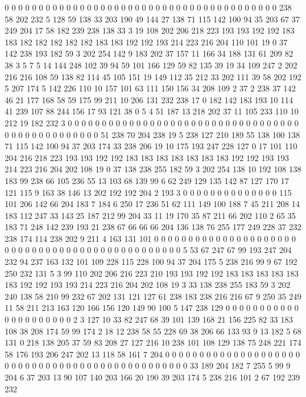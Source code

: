 0 0 0 0 0 0 0 0 0 0 0 0 0 0 0 0 0 0 0 0
0 0 0 0 0 0 0 0 0 0 0 0 0 0 0 0 0 0 0 0
238 58 202 232 5 128 59 138 33 203 190 49 144 27 138 71 115 142 100 94
35 203 67 37 249 204 17 58 182 239 238 138 33 3 19 108 202 206 218 223
193 193 192 192 183 183 182 182 182 182 182 183 183 192 192 193 214 223 216 204
110 101 19 0 37 142 238 193 182 59 3 202 254 142 9 183 202 37 157 11
166 34 188 131 61 209 82 38 3 5 7 5 14 144 248 102 39 94 59 101
166 129 59 82 135 39 19 34 109 247 2 202 216 216 108 59 138 82 114 45
105 151 19 149 112 35 212 33 202 111 39 58 202 192 5 207 174 5 142 226
110 10 157 101 63 111 150 156 34 208 109 2 37 2 238 37 142 46 21 177
168 58 59 175 99 211 10 206 131 232 238 17 0 182 142 183 193 10 114 41
239 107 88 244 156 17 93 121 38 0 5 4 51 187 13 218 202 37 11 105
233 110 10 212 19 182 232 3 0 0 0 0 0 0 0 0 0 0 0 0
0 0 0 0 0 0 0 0 0 0 0 0 0 0 0 0 0 0 0 0
0 0 0 0 0 0 0 0 0 0 0 0 0 0 0 0 51 238 70 204
238 19 5 238 127 210 189 55 138 100 138 71 115 142 100 94 37 203 174 33
238 206 19 10 175 193 247 228 127 0 17 101 110 204 216 218 223 193 193 192
192 183 183 183 183 183 183 183 192 192 193 193 214 223 216 204 202 108 19 0
37 138 238 255 182 59 3 202 254 138 10 192 108 138 183 99 238 66 105 236
55 13 103 68 139 99 6 62 249 129 135 142 87 127 170 17 121 115 9 163
38 146 13 202 192 192 204 2 193 3 0 0 0 0 0 0 0 0 0 0
0 0 0 0 115 101 206 142 66 204 183 7 184 6 250 17 236 51 62 111
149 100 188 7 45 211 208 14 183 112 247 33 143 25 187 212 99 204 33 11
19 170 35 87 211 66 202 110 2 65 35 183 71 248 142 239 193 21 238 67
66 66 66 204 136 138 76 255 177 249 228 37 232 238 174 114 238 202 9 211
4 163 131 101 0 0 0 0 0 0 0 0 0 0 0 0 0 0 0 0
0 0 0 0 0 0 0 0 0 0 0 0 0 0 0 0 0 0 0 0
0 0 0 0 0 0 0 0 0 0 0 5 53 67 247 67 99 193 247 204
232 94 237 163 132 101 109 228 115 228 100 94 37 204 175 5 238 216 99 9
67 192 250 232 131 5 3 99 110 202 206 216 223 210 193 193 192 192 183 183
183 183 183 183 192 192 193 193 214 223 216 204 202 108 19 3 33 138 238 255
183 59 3 202 240 138 58 210 99 232 67 202 131 121 127 61 238 183 238 216
216 67 9 250 35 249 11 58 211 213 163 120 166 156 120 149 90 100 5 147
238 129 0 0 0 0 0 0 0 0 0 0 0 0 0 0 0 0 0 0
0 0 0 2 3 127 10 33 82 247 68 39 101 139 168 21 156 225 82 33
183 108 38 208 174 59 99 174 2 18 12 238 58 55 228 69 38 206 66 133
93 9 13 182 5 68 131 0 218 138 205 37 59 83 208 27 127 216 10 238
101 108 129 138 75 248 221 174 58 176 193 206 247 202 13 118 58 161 7 204
0 0 0 0 0 0 0 0 0 0 0 0 0 0 0 0 0 0 0 0
0 0 0 0 0 0 0 0 0 0 0 0 0 0 0 0 0 0 0 0
0 0 0 0 0 0 0 33 189 204 182 7 255 5 99 9 204 6 37 203
13 90 107 140 203 166 20 190 39 203 174 5 238 216 101 2 67 192 239 232
